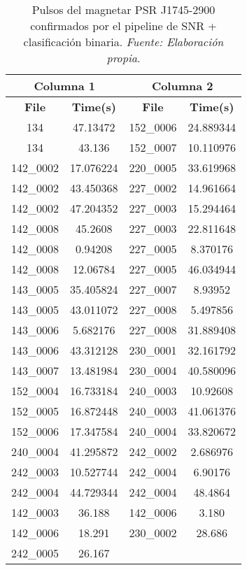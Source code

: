\begin{table}[H]
    \centering
    \caption{Pulsos del magnetar PSR J1745-2900 confirmados por el pipeline de SNR + clasificación binaria. \textit{Fuente: Elaboración propia}.}
    \label{tab:anexo_alma_confirmed_pulses}
    \begin{tabular}{|c|c|c|c|}
        \hline
        \multicolumn{2}{|c|}{\textbf{Columna 1}} & \multicolumn{2}{|c|}{\textbf{Columna 2}} \\
        \hline
        \textbf{File} & \textbf{Time(s)} & \textbf{File} & \textbf{Time(s)} \\
        \hline
        134 & 47.13472 & 152\_0006 & 24.889344 \\
        134 & 43.136 & 152\_0007 & 10.110976 \\
        142\_0002 & 17.076224 & 220\_0005 & 33.619968 \\
        142\_0002 & 43.450368 & 227\_0002 & 14.961664 \\
        142\_0002 & 47.204352 & 227\_0003 & 15.294464 \\
        142\_0008 & 45.2608 & 227\_0003 & 22.811648 \\
        142\_0008 & 0.94208 & 227\_0005 & 8.370176 \\
        142\_0008 & 12.06784 & 227\_0005 & 46.034944 \\
        143\_0005 & 35.405824 & 227\_0007 & 8.93952 \\
        143\_0005 & 43.011072 & 227\_0008 & 5.497856 \\
        143\_0006 & 5.682176 & 227\_0008 & 31.889408 \\
        143\_0006 & 43.312128 & 230\_0001 & 32.161792 \\
        143\_0007 & 13.481984 & 230\_0004 & 40.580096 \\
        152\_0004 & 16.733184 & 240\_0003 & 10.92608 \\
        152\_0005 & 16.872448 & 240\_0003 & 41.061376 \\
        152\_0006 & 17.347584 & 240\_0004 & 33.820672 \\
        240\_0004 & 41.295872 & 242\_0002 & 2.686976 \\
        242\_0003 & 10.527744 & 242\_0004 & 6.90176 \\
        242\_0004 & 44.729344 & 242\_0004 & 48.4864 \\
        142\_0003 & 36.188 & 142\_0006 & 3.180 \\
        142\_0006 & 18.291 & 230\_0002 & 28.686 \\
        242\_0005 & 26.167 & & \\
        \hline
    \end{tabular}
\end{table}

